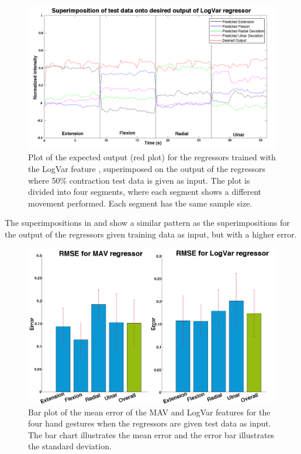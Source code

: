 \begin{figure}[H]
	\includegraphics[width=1\textwidth]{figures/results/NewSuperPoisonLogVarNewData}  %
	\caption{Plot of the expected output (red plot) for the regressors trained with the LogVar feature , superimposed on the output of the regressors where 50\% contraction test data is given as input. The plot is divided into four segments, where each segment shows a different movement performed. Each segment has the same sample size.}
	\label{fig:SuperPoisonLogVarNewData}  %
\end{figure}

The superimpositions in  and  show a similar pattern as the superimpositions for the output of the regressors given training data as input, but with a higher error. 

\begin{figure}[H]
	\includegraphics[width=1\textwidth]{figures/results/RMSEBarPlotNewData}  %
	\caption{Bar plot of the mean error of the MAV and LogVar features for the four hand gestures when the regressors are given test data as input. The bar chart illustrates the mean error and the error bar illustrates the standard deviation.}
	\label{fig:RMSEBarPlotNewData}  %
\end{figure}

